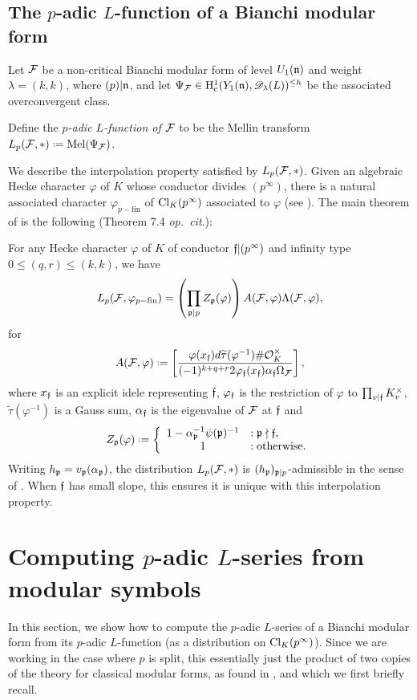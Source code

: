 \documentclass[a4paper,10pt]{article}
\newcommand{\unitsize}{\#\roi_K^\times}
\newcommand{\DD}{\mathscr{D}}
\newcommand{\hc}{\h^1_{\mathrm{c}}}
\newcommand{\ssh}{^{\leq h}}
\newcommand{\Y}{Y_1(\n)}
\newcommand{\mel}{\mathrm{Mel}}
\numberwithin{equation}{section}
\begin{document}
\subsection{The $p$-adic $L$-function of a Bianchi modular form}\label{padic lfunction section}
Let $\mathcal{F}$ be a non-critical Bianchi modular form of level $U_1(\mathfrak{n})$ and weight $\lambda = (k,k)$, where $(p)|\mathfrak{n}$, and let $\Psi_{\f} \in \hc(\Y,\DD_{\lambda}(L))\ssh$ be the associated overconvergent class.  
\begin{definition} 
Define the \emph{$p$-adic $L$-function of $\mathcal{F}$} to be the Mellin transform $L_p(\f,*) \defeq \mel(\Psi_{\f})$.
\end{definition}
We describe the interpolation property satisfied by $L_p(\mathcal{F},*)$. Given an algebraic Hecke character $\varphi$ of $K$ whose conductor divides $(p^\infty)$, there is a natural associated character $\varphi_{p-\mathrm{fin}}$ of $\mathrm{Cl}_K(p^\infty)$ associated to $\varphi$ (see \cite[\S7.3]{Wil17}). The main theorem of \cite{Wil17} is the following (Theorem 7.4 \emph{op.\ cit}.):
\begin{theorem}\label{thm:Wil17}
For any Hecke character $\varphi$ of $K$ of conductor $\mathfrak{f}|(p^\infty)$ and infinity type $0 \leq (q,r) \leq (k,k)$, we have
\[L_p(\mathcal{F},\varphi_{p-\mathrm{fin}}) = \left(\prod_{\mathfrak{p}|p}Z_{\mathfrak{p}}(\varphi)\right)A(\mathcal{F},\varphi)\Lambda(\mathcal{F},\varphi),\]
for
\[ 
A(\f,\varphi) \defeq  \left[\frac{\varphi(x_{\ff})d\widetilde{\tau}(\varphi^{-1})\unitsize}{(-1)^{k+q+r}2\varphi_{\ff}(x_{\ff})\alpha_{\ff}\Omega_{\f}}\right],
\]
where $x_{\mathfrak{f}}$ is an explicit idele representing $\mathfrak{f}$, $\varphi_{\mathfrak{f}}$ is the restriction of $\varphi$ to $\prod_{v|\mathfrak{f}}K_v^\times$, $\widetilde{\tau}(\varphi^{-1})$ is a Gauss sum, $\alpha_{\mathfrak{f}}$ is the eigenvalue of $\mathcal{F}$ at $\mathfrak{f}$ and
\[Z_{\pri}(\varphi) \defeq \left\{\begin{array}{cl}1-\alpha_{\pri}^{-1}\psi(\pri)^{-1} &: \pri\nmid \ff,\\
1 &: \text{otherwise}.\end{array}\right.
\]
Writing $h_{\mathfrak{p}} = v_{\mathfrak{p}}(\alpha_{\mathfrak{p}})$, the distribution $L_p(\mathcal{F},*)$ is $(h_{\mathfrak{p}})_{\mathfrak{p}|p}$-admissible in the sense of \cite[Defns. 5.10,6.14]{Wil17}. When $\mathfrak{f}$ has small slope, this ensures it is unique with this interpolation property. 
\end{theorem}



\section{Computing \texorpdfstring{$p$}{p}-adic \texorpdfstring{$L$}{L}-series from modular symbols}
In this section, we show how to compute the $p$-adic $L$-series of a Bianchi modular form from its $p$-adic $L$-function (as a distribution on $\mathrm{Cl}_K(p^\infty)$). Since we are working in the case where $p$ is split, this essentially just the product of two copies of the theory for classical modular forms, as found in \cite[\S9]{PS11}, and which we first briefly recall.
\end{document}
